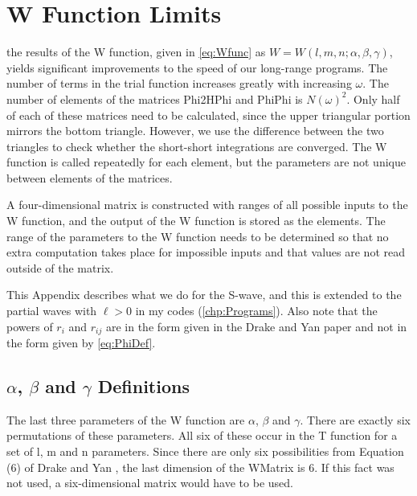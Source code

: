 \documentclass[Dissertation.tex]{subfiles}
\begin{document}
\chapter{W Function Limits}
\label{chp:WLimits}

\iftoggle{UNT}{Precalculating}{\lettrine{\textcolor{startcolor}{P}}{recalculating}}
the results of the W function, given in \cref{eq:Wfunc} as
$W = W(l,m,n;\alpha,\beta,\gamma)$,
yields significant improvements to the speed of our long-range programs.  The 
number of terms in the trial function increases greatly with increasing
$\omega$. The number of elements of the matrices Phi2HPhi and PhiPhi is
$N(\omega)^2$. Only half of each of these matrices need to be calculated, 
since the upper triangular portion mirrors the bottom triangle. However, we 
use the difference between the two triangles to check whether the short-short 
integrations are converged. The W function is called repeatedly for each 
element, but the parameters are not unique between elements of the matrices.

A four-dimensional matrix is constructed with ranges of all possible inputs 
to the W function, and the output of the W function is stored as the 
elements. The range of the parameters to the W function needs to be 
determined so that no extra computation takes place for impossible inputs and 
that values are not read outside of the matrix.

This Appendix describes what we do for the S-wave, and this is extended to the 
partial waves with $\ell > 0$ in my codes (\cref{chp:Programs}).
Also note that the powers of $r_i$ and $r_{ij}$ are in the form given in the
Drake and Yan \cite{Drake1995} paper and not in the form given by \cref{eq:PhiDef}.

\section{\texorpdfstring{$\alpha$, $\beta$ and $\gamma$} {alpha, beta and gamma} Definitions}

The last three parameters of the W function are $\alpha$, $\beta$ and $\gamma$.
There are exactly six permutations of these parameters. All six of these 
occur in the T function for a set of l, m and n parameters. Since there are 
only six possibilities from Equation (6) of Drake and Yan \cite{Drake1995}, 
the last dimension of the WMatrix is 6. If this fact was not used, a
six-dimensional matrix would have to be used.
\end{document}

